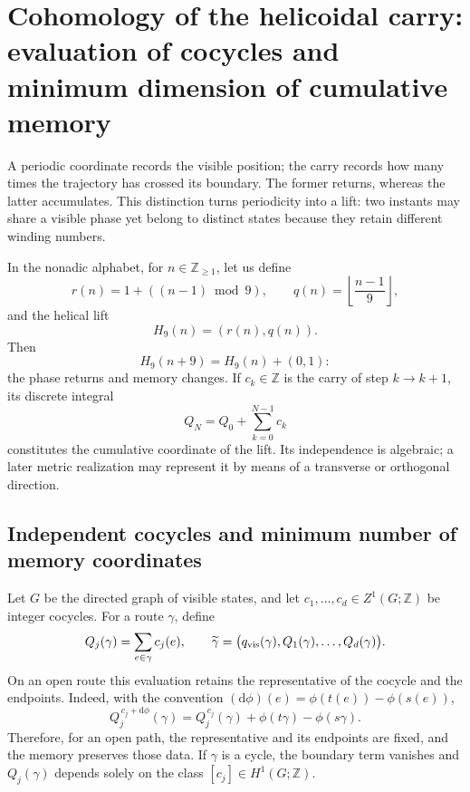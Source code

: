 \chapter{Cohomology of the helicoidal carry: evaluation of cocycles and minimum dimension of cumulative memory}
\label{chap:elevacion-cohomologica-dimension-rev2}

A periodic coordinate records the visible position; the carry records how many times the trajectory has crossed its boundary. The former returns, whereas the latter accumulates. This distinction turns periodicity into a lift: two instants may share a visible phase yet belong to distinct states because they retain different winding numbers.

In the nonadic alphabet, for \(n\in\mathbb Z_{\geq1}\), let us define
\[
 r(n)=1+((n-1)\bmod9),
 \qquad
 q(n)=\left\lfloor\frac{n-1}{9}\right\rfloor,
\]
and the helical lift
\begin{equation}
 H_9(n)=(r(n),q(n)).
 \label{eq:elevacion-helicoidal-nonadica-rev2}
\end{equation}
Then
\[
 H_9(n+9)=H_9(n)+(0,1):
\]
the phase returns and memory changes. If \(c_k\in\mathbb Z\) is the carry of step \(k\to k+1\), its discrete integral
\begin{equation}
 Q_N=Q_0+\sum_{k=0}^{N-1}c_k
 \label{eq:integral-discreta-carry-rev2}
\end{equation}
constitutes the cumulative coordinate of the lift. Its independence is
algebraic; a later metric realization may represent it by means of
a transverse or orthogonal direction.

\section{Independent cocycles and minimum number of memory coordinates}

Let \(G\) be the directed graph of visible states, and let
\(c_1,\ldots,c_d\in Z^1(G;\mathbb Z)\) be integer cocycles. For a route
\(\gamma\), define
\[
 Q_j(\gamma)=\sum_{e\in\gamma}c_j(e),
 \qquad
 \widetilde\gamma=
 \bigl(q_{\rm vis}(\gamma),Q_1(\gamma),\ldots,Q_d(\gamma)\bigr).
\]
On an open route this evaluation retains the representative of the cocycle
and the endpoints. Indeed, with the convention
\((\mathrm d\phi)(e)=\phi(t(e))-\phi(s(e))\),
\begin{equation}
 Q_j^{\,c_j+\mathrm d\phi}(\gamma)
 =Q_j^{\,c_j}(\gamma)+\phi(t\gamma)-\phi(s\gamma).
 \label{eq:cambio-representante-cociclo-ruta-rev2}
\end{equation}
Therefore, for an open path, the representative and its endpoints are fixed,
and the memory preserves those data. If \(\gamma\) is a cycle, the
boundary term vanishes and \(Q_j(\gamma)\) depends solely on the class
\([c_j]\in H^1(G;\mathbb Z)\).

